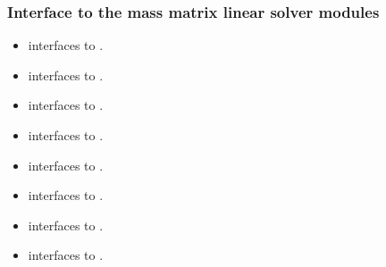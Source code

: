 \documentclass[letterpaper,10pt,english]{sphinxmanual}
\begin{document}
\subsubsection{Interface to the mass matrix linear solver modules}
\label{f_interface/Routines:interface-to-the-mass-matrix-linear-solver-modules}\begin{itemize}
\item {} 
{\hyperref[f_interface/Usage:f/_/FARKMASSDENSE]{\emph{}}} interfaces to {\hyperref[c_interface/User_callable:c.ARKMassDense]{\emph{}}}.

\item {} 
{\hyperref[f_interface/Usage:f/_/FARKMASSLAPACKDENSE]{\emph{}}} interfaces to
{\hyperref[c_interface/User_callable:c.ARKMassLapackDense]{\emph{}}}.

\item {} 
{\hyperref[f_interface/Usage:f/_/FARKDENSESETMASS]{\emph{}}} interfaces to
{\hyperref[c_interface/User_callable:c.ARKDlsSetDenseMassFn]{\emph{}}}.

\item {} 
{\hyperref[f_interface/Usage:f/_/FARKMASSBAND]{\emph{}}} interfaces to {\hyperref[c_interface/User_callable:c.ARKMassBand]{\emph{}}}.

\item {} 
{\hyperref[f_interface/Usage:f/_/FARKMASSLAPACKBAND]{\emph{}}} interfaces to
{\hyperref[c_interface/User_callable:c.ARKMassLapackBand]{\emph{}}}.

\item {} 
{\hyperref[f_interface/Usage:f/_/FARKBANDSETMASS]{\emph{}}} interfaces to
{\hyperref[c_interface/User_callable:c.ARKDlsSetBandMassFn]{\emph{}}}.

\item {} 
{\hyperref[f_interface/Usage:f/_/FARKMASSKLU]{\emph{}}} interfaces to {\hyperref[c_interface/User_callable:c.ARKMassKLU]{\emph{}}}.

\item {} 
{\hyperref[f_interface/Usage:f/_/FARKMASSSUPERLUMT]{\emph{}}} interfaces to
{\hyperref[c_interface/User_callable:c.ARKMassSuperLUMT]{\emph{}}}.


\end{itemize}
\end{document}
